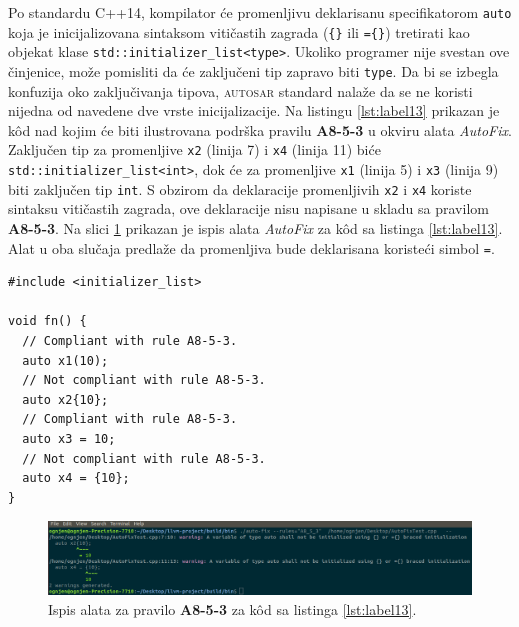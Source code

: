 \documentclass[12pt,oneside]{memoir}
\begin{document}
Po standardu C++14, kompilator \'{c}e  promenljivu deklarisanu specifikatorom \texttt{auto} koja je inicijalizovana sintaksom viti\v{c}astih zagrada (\texttt{\{\}} ili \texttt{=\{\}}) tretirati kao objekat klase
\texttt{std::initializer\_list<type>}. Ukoliko programer nije svestan ove \v{c}injenice, mo\v{z}e pomisliti da \'{c}e zaklju\v{c}eni tip zapravo biti \texttt{type}. Da bi se izbegla konfuzija oko zaklju\v{c}ivanja
tipova, \textsc{autosar} standard nala\v{z}e da se ne koristi nijedna od navedene dve vrste inicijalizacije.
Na listingu \ref{lst:label13} prikazan je k\^{o}d nad kojim \'{c}e biti ilustrovana podr\v{s}ka pravilu \textbf{A8-5-3} u okviru alata \textit{AutoFix}. 
Zaklju\v{c}en tip za promenljive \texttt{x2} (linija 7) i \texttt{x4} (linija 11) bi\'c{e} \texttt{std::initializer\_list<int>}, dok \'{c}e za promenljive \texttt{x1} (linija 5) i \texttt{x3} (linija 9) biti zaklju\v{c}en tip \texttt{int}. S obzirom da deklaracije promenljivih \texttt{x2} i \texttt{x4} koriste sintaksu
viti\v{c}astih zagrada, ove deklaracije nisu napisane u skladu sa pravilom \textbf{A8-5-3}.
Na slici \ref{fig:A8-5-3} prikazan je ispis alata \textit{AutoFix} za k\^{o}d sa listinga \ref{lst:label13}. Alat u oba slu\v{c}aja predla\v{z}e
da promenljiva bude deklarisana koriste\'{c}i simbol \texttt{=}.

\begin{lstlisting}[style=customc, caption={K\^{o}d nad kojim je demonstrirana podr\v{s}ka pravilu \textbf{A8-5-3} u okviru alata \textit{AutoFix}. Ispis alata \textit{AutoFix} nakon pokretanja nad ovim kodom prikazan je na slici \ref{fig:A8-5-3}.}, label=lst:label13]
#include <initializer_list>

void fn() {
  // Compliant with rule A8-5-3.
  auto x1(10);
  // Not compliant with rule A8-5-3.
  auto x2{10};
  // Compliant with rule A8-5-3.
  auto x3 = 10;
  // Not compliant with rule A8-5-3.
  auto x4 = {10};
}

\end{lstlisting}

\begin{figure}[!h]
\begin{center}
\includegraphics[scale=0.3]{A8_5_3.png}
\end{center}
\caption{Ispis alata za pravilo \textbf{A8-5-3} za k\^{o}d sa listinga \ref{lst:label13}.}
\label{fig:A8-5-3}
\end{figure}
\end{document}
